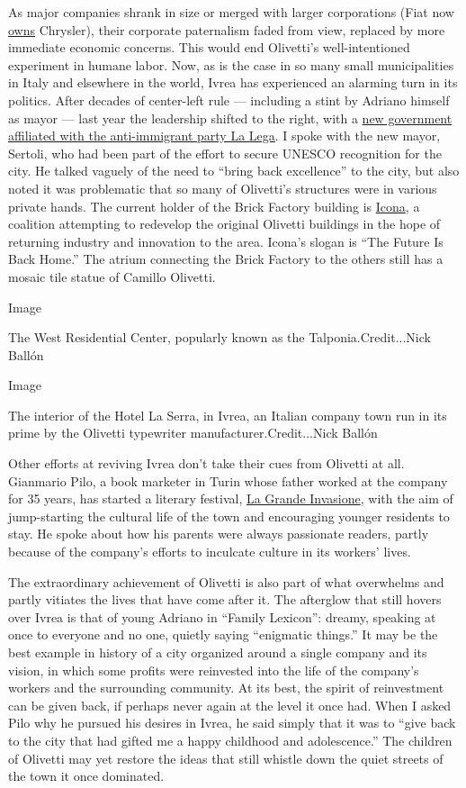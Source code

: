 As major companies shrank in size or merged with larger corporations
(Fiat now
\href{https://www.nytimes.com/topic/company/fiat-chrysler-automobiles-nv}{owns}
Chrysler), their corporate paternalism faded from view, replaced by more
immediate economic concerns. This would end Olivetti's well-intentioned
experiment in humane labor. Now, as is the case in so many small
municipalities in Italy and elsewhere in the world, Ivrea has
experienced an alarming turn in its politics. After decades of
center-left rule --- including a stint by Adriano himself as mayor ---
last year the leadership shifted to the right, with a
\href{https://www.nytimes.com/2018/03/04/world/europe/italy-election.html}{new
government affiliated with the anti-immigrant party La Lega}. I spoke
with the new mayor, Sertoli, who had been part of the effort to secure
UNESCO recognition for the city. He talked vaguely of the need to
``bring back excellence'' to the city, but also noted it was problematic
that so many of Olivetti's structures were in various private hands. The
current holder of the Brick Factory building is
\href{https://www.icona.srl/?lang=en}{Icona}, a coalition attempting to
redevelop the original Olivetti buildings in the hope of returning
industry and innovation to the area. Icona's slogan is ``The Future Is
Back Home.'' The atrium connecting the Brick Factory to the others still
has a mosaic tile statue of Camillo Olivetti.

Image

The West Residential Center, popularly known as the
Talponia.Credit...Nick Ballón

Image

The interior of the Hotel La Serra, in Ivrea, an Italian company town
run in its prime by the Olivetti typewriter manufacturer.Credit...Nick
Ballón

Other efforts at reviving Ivrea don't take their cues from Olivetti at
all. Gianmario Pilo, a book marketer in Turin whose father worked at the
company for 35 years, has started a literary festival,
\href{http://www.lagrandeinvasione.it/}{La Grande Invasione}, with the
aim of jump-starting the cultural life of the town and encouraging
younger residents to stay. He spoke about how his parents were always
passionate readers, partly because of the company's efforts to inculcate
culture in its workers' lives.

The extraordinary achievement of Olivetti is also part of what
overwhelms and partly vitiates the lives that have come after it. The
afterglow that still hovers over Ivrea is that of young Adriano in
``Family Lexicon'': dreamy, speaking at once to everyone and no one,
quietly saying ``enigmatic things.'' It may be the best example in
history of a city organized around a single company and its vision, in
which some profits were reinvested into the life of the company's
workers and the surrounding community. At its best, the spirit of
reinvestment can be given back, if perhaps never again at the level it
once had. When I asked Pilo why he pursued his desires in Ivrea, he said
simply that it was to ``give back to the city that had gifted me a happy
childhood and adolescence.'' The children of Olivetti may yet restore
the ideas that still whistle down the quiet streets of the town it once
dominated.

